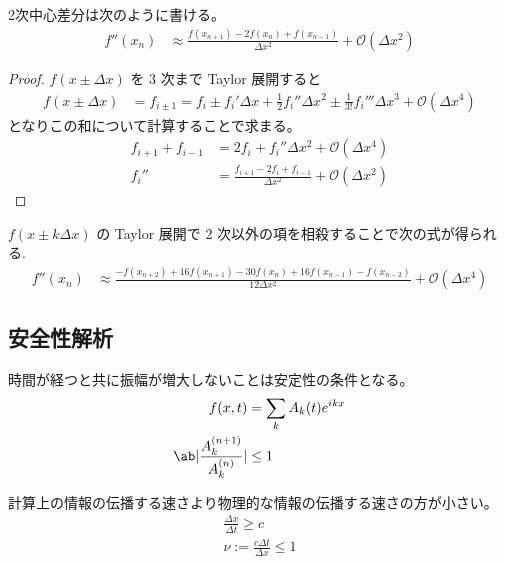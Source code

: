 \documentclass[uplatex,diffipdfmx,a4paper,11pt]{jlreq}
\begin{document}
\begin{theorem}
  2次中心差分は次のように書ける。
  \begin{align}
    f''(x_n) & \approx \frac{f(x_{n+1}) - 2f(x_n) + f(x_{n-1})}{\Delta x^2} + \mathcal{O}(\Delta x^2)
  \end{align}
\end{theorem}
\begin{proof}
  $f(x \pm \Delta x)$ を 3 次まで Taylor 展開すると
  \begin{align}
    f(x \pm \Delta x) & = f_{i \pm 1} = f_i \pm f_i'\Delta x + \frac{1}{2}f_i''\Delta x^2 \pm \frac{1}{3!}f_i'''\Delta x^3 + \mathcal{O}(\Delta x^4)
  \end{align}
  となりこの和について計算することで求まる。
  \begin{align}
    f_{i + 1} + f_{i - 1} & = 2f_i + f_i''\Delta x^2 + \mathcal{O}(\Delta x^4)                          \\
    f_i''                 & = \frac{f_{i + 1} - 2f_i + f_{i - 1}}{\Delta x^2} + \mathcal{O}(\Delta x^2)
  \end{align}
\end{proof}

\begin{theorem}[2階微分の差分公式]
  $f(x\pm k\Delta x)$ の Taylor 展開で 2 次以外の項を相殺することで次の式が得られる.
  \begin{align}
    f''(x_n) & \approx \frac{-f(x_{n+2}) + 16f(x_{n+1}) - 30f(x_n) + 16f(x_{n-1}) - f(x_{n-2})}{12\Delta x^2} + \mathcal{O}(\Delta x^4)
  \end{align}
\end{theorem}

\subsection{安全性解析}
\begin{definition}
  時間が経つと共に振幅が増大しないことは安定性の条件となる。
  \begin{align}
    f(x, t)                            & = \sum_kA_k(t)e^{ikx} \\
    \ab|\frac{A_k^{(n+1)}}{A_k^{(n)}}| & \leq 1
  \end{align}
\end{definition}

\begin{definition}
  計算上の情報の伝播する速さより物理的な情報の伝播する速さの方が小さい。
  \begin{align}
    \frac{\Delta x}{\Delta t} \geq c \\
    \nu := \frac{c\Delta t}{\Delta x} \leq 1
  \end{align}
\end{definition}
\end{document}
